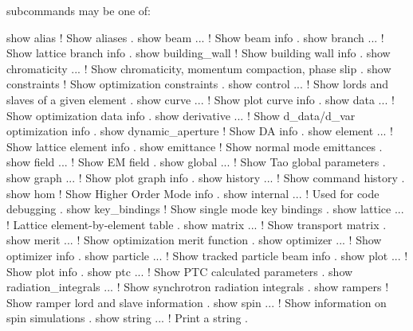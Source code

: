 {{{{{{{ subcommands may be one of:
\begin{example}
  show alias                   ! Show aliases .
  show beam ...                ! Show beam info .
  show branch ...              ! Show lattice branch info .
  show building_wall           ! Show building wall info .
  show chromaticity ...        ! Show chromaticity, momentum compaction, phase slip .
  show constraints             ! Show optimization constraints .
  show control ...             ! Show lords and slaves of a given element .
  show curve ...               ! Show plot curve info .
  show data ...                ! Show optimization data info .
  show derivative ...          ! Show d_data/d_var optimization info .
  show dynamic_aperture        ! Show DA info .
  show element ...             ! Show lattice element info .
  show emittance               ! Show normal mode emittances .
  show field ...               ! Show EM field .
  show global ...              ! Show Tao global parameters .
  show graph ...               ! Show plot graph info .
  show history ...             ! Show command history .
  show hom                     ! Show Higher Order Mode info .
  show internal ...            ! Used for code debugging .
  show key_bindings            ! Show single mode key bindings .
  show lattice ...             ! Lattice element-by-element table .
  show matrix ...              ! Show transport matrix .
  show merit ...               ! Show optimization merit function .
  show optimizer ...           ! Show optimizer info .
  show particle ...            ! Show tracked particle beam info .
  show plot ...                ! Show plot info .
  show ptc ...                 ! Show PTC calculated parameters .
  show radiation_integrals ... ! Show synchrotron radiation integrals .
  show rampers                 ! Show ramper lord and slave information .
  show spin ...                ! Show information on spin simulations .
  show string ...              ! Print a string .

\end{example}}}}}}}}

